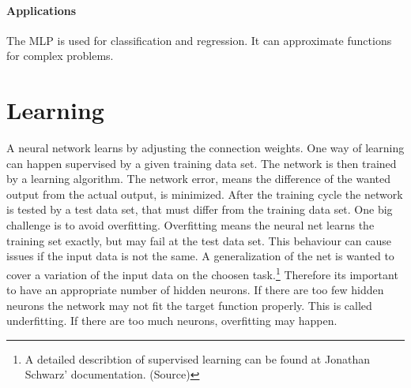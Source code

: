 \documentclass[10pt,a4paper,DIV=11]{scrreprt}
\begin{document}
\paragraph*{Applications}

The MLP is used for classification and  regression. It can approximate functions for complex problems.





\section{Learning}
A neural network learns by adjusting the connection weights.
One way of learning can happen supervised by a given training data set. The network is then trained by a learning algorithm. The network error, means the difference of the wanted output from the actual output, is minimized. After the training cycle the network is tested by a test data set, that must differ from the training data set. One big challenge is to avoid overfitting. Overfitting means the neural net learns the training set exactly, but may fail at the test data set. This behaviour can cause issues if the input data is not the same. A generalization of the net is wanted to cover a variation of the input data on the choosen task.\footnote{A detailed describtion of supervised learning can be found at Jonathan Schwarz' documentation. (Source)} Therefore its important to have an appropriate number of hidden neurons. If there are too few hidden neurons the network may not fit the target function properly. This is called underfitting. If there are too much neurons, overfitting may happen.\\
\end{document}
